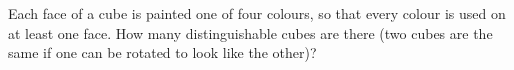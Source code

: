 Each face of a cube is painted one of four colours, so that every colour is used on at least one face. How many distinguishable cubes are there (two cubes are the same if one can be rotated to look like the other)?
